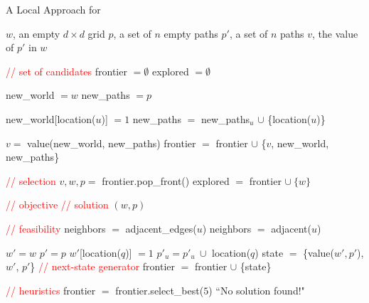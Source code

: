 \documentclass[../main.tex]{subfiles}
\begin{document}
\begin{algorithm}
\caption{A Local Approach for \prob}
\label{fig:loc-pseudocode}
    \begin{algorithmic}[1]
        \REQUIRE $w$, an empty $d\times d$ grid
        \REQUIRE $p$, a set of $n$ empty paths
        \ENSURE $p'$, a set of $n$ paths
        \ENSURE $v$, the value of $p'$ in $w$

        \STATE \textcolor{red}{// set of candidates}
        \STATE frontier $=\emptyset$
        \STATE explored $=\emptyset$

            \STATE new\_world $=w$
            \STATE new\_paths $=p$

                \STATE new\_world[location($u$)] $=1$
                \STATE new\_paths $=$ new\_paths$_u$ $\cup$ \{location($u$)\}
            \ENDFOR

            \STATE $v=$ value(new\_world, new\_paths)
            \STATE frontier $=$ frontier $\cup$ \{$v$, new\_world, new\_paths\}
        \ENDFOR

            \STATE \textcolor{red}{// selection}
            \STATE $v,w,p=$ frontier.pop\_front()
            \STATE explored $=$ frontier $\cup\ \{w\}$

            \STATE \textcolor{red}{// objective}
                \STATE \textcolor{red}{// solution}
                \RETURN $(w,p)$
            \ENDIF

            \STATE \textcolor{red}{// feasibility}
                    \STATE neighbors $=$ adjacent\_edges($u$)
                \ELSE
                    \STATE neighbors $=$ adjacent($u$)
                \ENDIF

                    \STATE $w'=w$
                    \STATE $p'=p$
                    \STATE $w'$[location($q$)] $=1$
                    \STATE $p'_u=p'_u\ \cup$ location($q$)
                    \STATE state $=$ \{value($w',p'$), $w'$, $p'$\}
                        \STATE \textcolor{red}{// next-state generator}
                        \STATE frontier $=$ frontier $\cup$ \{state\}
                    \ENDIF
                \ENDFOR
            \ENDFOR

            \STATE \textcolor{red}{// heuristics}
            \STATE frontier $=$ frontier.select\_best($5$)
        \ENDWHILE
        \RETURN ``No solution found!"
    \end{algorithmic}
\end{algorithm}
\end{document}
